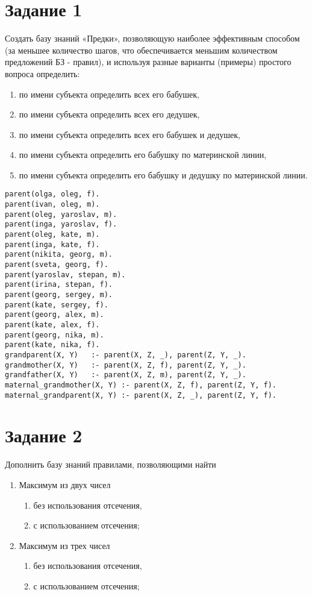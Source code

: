 \documentclass[a4paper,14pt, unknownkeysallowed]{extreport}
\begin{document}


\section*{Задание 1}
Создать базу знаний «Предки», позволяющую наиболее эффективным способом
(за меньшее количество шагов, что обеспечивается меньшим количеством предложений БЗ - правил), и используя разные варианты (примеры) простого вопроса определить:
\begin{enumerate}
	\item по имени субъекта определить всех его бабушек,
	\item по имени субъекта определить всех его дедушек,
	\item по имени субъекта определить всех его бабушек и дедушек,
	\item по имени субъекта определить его бабушку по материнской линии,
	\item по имени субъекта определить его бабушку и дедушку по материнской линии.
\end{enumerate}

\begin{lstlisting}
parent(olga, oleg, f).
parent(ivan, oleg, m).
parent(oleg, yaroslav, m).
parent(inga, yaroslav, f).
parent(oleg, kate, m).
parent(inga, kate, f).
parent(nikita, georg, m).
parent(sveta, georg, f).
parent(yaroslav, stepan, m).
parent(irina, stepan, f).
parent(georg, sergey, m).
parent(kate, sergey, f).
parent(georg, alex, m).
parent(kate, alex, f).
parent(georg, nika, m).
parent(kate, nika, f).
grandparent(X, Y)   :- parent(X, Z, _), parent(Z, Y, _).
grandmother(X, Y)   :- parent(X, Z, f), parent(Z, Y, _).
grandfather(X, Y)   :- parent(X, Z, m), parent(Z, Y, _).
maternal_grandmother(X, Y) :- parent(X, Z, f), parent(Z, Y, f).
maternal_grandparent(X, Y) :- parent(X, Z, _), parent(Z, Y, f).	
\end{lstlisting}

\section*{Задание 2}

Дополнить базу знаний правилами, позволяющими найти
\begin{enumerate}
	\item Максимум из двух чисел
	\begin{enumerate}
		\item без использования отсечения,
		\item с использованием отсечения;
	\end{enumerate}
	\item Максимум из трех чисел
	\begin{enumerate}
		\item без использования отсечения,
		\item с использованием отсечения;
	\end{enumerate}
\end{enumerate}
\end{document}
